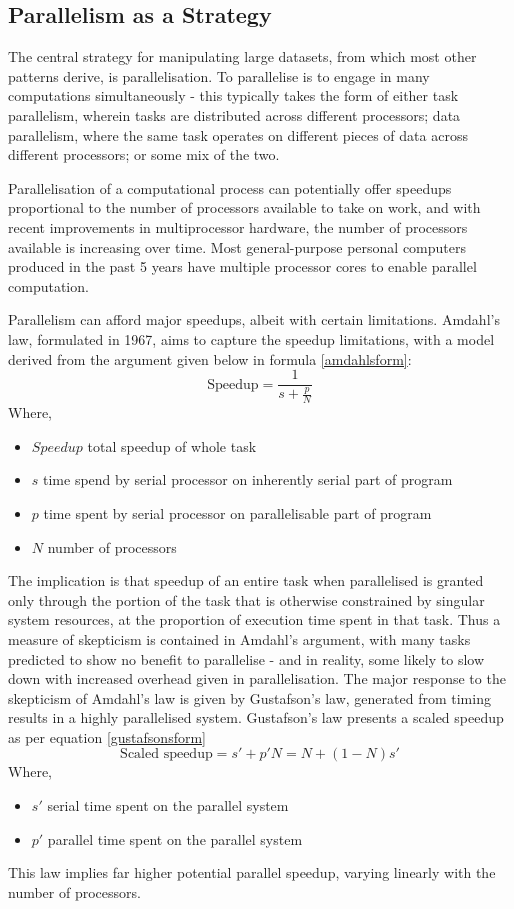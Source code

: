 \documentclass[a4paper,10pt]{article}
\begin{document}
\subsection{Parallelism as a Strategy}
\label{parallel}
The central strategy for manipulating large datasets, from which most other patterns derive, is parallelisation. To parallelise is to engage in many computations simultaneously - this typically takes the form of either task parallelism, wherein tasks are distributed across different processors; data parallelism, where the same task operates on different pieces of data across different processors; or some mix of the two.

Parallelisation of a computational process can potentially offer speedups proportional to the number of processors available to take on work, and with recent improvements in multiprocessor hardware, the number of processors available is increasing over time.
Most general-purpose personal computers produced in the past 5 years have multiple processor cores to enable parallel computation.

Parallelism can afford major speedups, albeit with certain limitations.
Amdahl's law, formulated in 1967, aims to capture the speedup limitations, with a model derived from the argument given below in formula \ref{amdahlsform}\cite{amdahl1967law}\cite{gustafson1988law}:
\begin{equation}
	\label{amdahlsform}
	\textrm{Speedup} = \frac{1}{s+\frac{p}{N}}
\end{equation}
Where,
\begin{itemize}
	\item \(Speedup\) total speedup of whole task
	\item \(s\) time spend by serial processor on inherently serial part of program
	\item \(p\) time spent by serial processor on parallelisable part of program
	\item \(N\) number of processors
\end{itemize}
The implication is that speedup of an entire task when parallelised is granted only through the portion of the task that is otherwise constrained by singular system resources, at the proportion of execution time spent in that task.
Thus a measure of skepticism is contained in Amdahl's argument, with many tasks predicted to show no benefit to parallelise - and in reality, some likely to slow down with increased overhead given in parallelisation. 
The major response to the skepticism of Amdahl's law is given by Gustafson's law, generated from timing results in a highly parallelised system.
Gustafson's law presents a scaled speedup as per equation \ref{gustafsonsform}
\begin{equation}
	\label{gustafsonsform}
	\textrm{Scaled speedup} = s' + p'N = N + (1-N)s'
\end{equation}
Where,
\begin{itemize}
	\item \(s'\) serial time spent on the parallel system
	\item \(p'\) parallel time spent on the parallel system
\end{itemize}
This law implies far higher potential parallel speedup, varying linearly with the number of processors.
\end{document}

